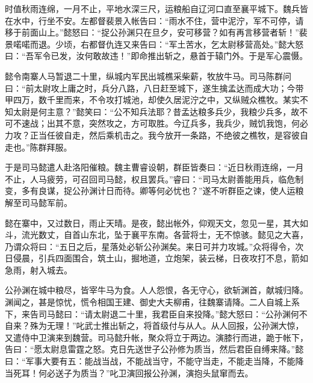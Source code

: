 时值秋雨连绵，一月不止，平地水深三尺，运粮船自辽河口直至襄平城下。魏兵皆在水中，行坐不安。左都督裴景入帐告曰：“雨水不住，营中泥泞，军不可停，请移于前面山上。”懿怒曰：“捉公孙渊只在旦夕，安可移营？如有再言移营者斩！”裴景喏喏而退。少顷，右都督仇连又来告曰：“军土苦水，乞太尉移营高处。”懿大怒曰：“吾军令已发，汝何敢故违！”即命推出斩之，悬首于辕门外。于是军心震慑。

懿令南寨人马暂退二十里，纵城内军民出城樵采柴薪，牧放牛马。司马陈群问曰：“前太尉攻上庸之时，兵分八路，八日赶至城下，遂生擒孟达而成大功；今带甲四万，数千里而来，不令攻打城池，却使久居泥泞之中，又纵贼众樵牧。某实不知太尉是何主意？”懿笑曰：“公不知兵法耶？昔孟达粮多兵少，我粮少兵多，故不可不速战；出其不意，突然攻之，方可取胜。今辽兵多，我兵少，贼饥我饱，何必力攻？正当任彼自走，然后乘机击之。我今放开一条路，不绝彼之樵牧，是容彼自走也。”陈群拜服。

于是司马懿遣人赴洛阳催粮。魏主曹睿设朝，群臣皆奏曰：“近日秋雨连绵，一月不止，人马疲劳，可召回司马懿，权且罢兵。”睿曰：“司马太尉善能用兵，临危制变，多有良谋，捉公孙渊计日而待。卿等何必忧也？”遂不听群臣之谏，使人运粮解至司马懿军前。

懿在寨中，又过数日，雨止天晴。是夜，懿出帐外，仰观天文，忽见一星，其大如斗，流光数丈，自首山东北，坠于襄平东南。各营将士，无不惊骇。懿见之大喜，乃谓众将曰：“五日之后，星落处必斩公孙渊矣。来日可并力攻城。”众将得令，次日侵晨，引兵四面围合，筑土山，掘地道，立炮架，装云梯，日夜攻打不息，箭如急雨，射入城去。

公孙渊在城中粮尽，皆宰牛马为食。人人怨恨，各无守心，欲斩渊首，献城归降。渊闻之，甚是惊忧，慌令相国王建、御史大夫柳甫，往魏寨请降。二人自城上系下，来告司马懿曰：“请太尉退二十里，我君臣自来投降。”懿大怒曰：“公孙渊何不自来？殊为无理！”叱武士推出斩之，将首级付与从人。从人回报，公孙渊大惊，又遣侍中卫演来到魏营。司马懿升帐，聚众将立于两边。演膝行而进，跪于帐下，告曰：“愿太尉息雷霆之怒。克日先送世子公孙修为质当，然后君臣自缚来降。”懿曰：“军事大要有五：能战当战，不能战当守，不能守当走，不能走当降，不能降当死耳！何必送子为质当？”叱卫演回报公孙渊，演抱头鼠窜而去。

